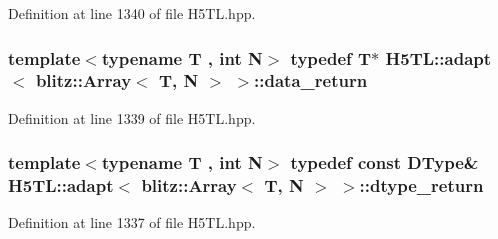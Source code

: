 Definition at line 1340 of file H5\-T\-L.\-hpp.

\hypertarget{struct_h5_t_l_1_1adapt_3_01blitz_1_1_array_3_01_t_00_01_n_01_4_01_4_a0e4d35a2e0a1c22042107b22afea18a4}{
\subsubsection[{data\-\_\-return}]{\setlength{\rightskip}{0pt plus 5cm}template$<$typename T , int N$>$ typedef T$\ast$ {\bf H5\-T\-L\-::adapt}$<$ blitz\-::\-Array$<$ T, N $>$ $>$\-::{\bf data\-\_\-return}}}\label{struct_h5_t_l_1_1adapt_3_01blitz_1_1_array_3_01_t_00_01_n_01_4_01_4_a0e4d35a2e0a1c22042107b22afea18a4}


Definition at line 1339 of file H5\-T\-L.\-hpp.

\hypertarget{struct_h5_t_l_1_1adapt_3_01blitz_1_1_array_3_01_t_00_01_n_01_4_01_4_af2875af95d8e3b980fcf97ce74363f52}{
\subsubsection[{dtype\-\_\-return}]{\setlength{\rightskip}{0pt plus 5cm}template$<$typename T , int N$>$ typedef const {\bf D\-Type}\& {\bf H5\-T\-L\-::adapt}$<$ blitz\-::\-Array$<$ T, N $>$ $>$\-::{\bf dtype\-\_\-return}}}\label{struct_h5_t_l_1_1adapt_3_01blitz_1_1_array_3_01_t_00_01_n_01_4_01_4_af2875af95d8e3b980fcf97ce74363f52}


Definition at line 1337 of file H5\-T\-L.\-hpp.



